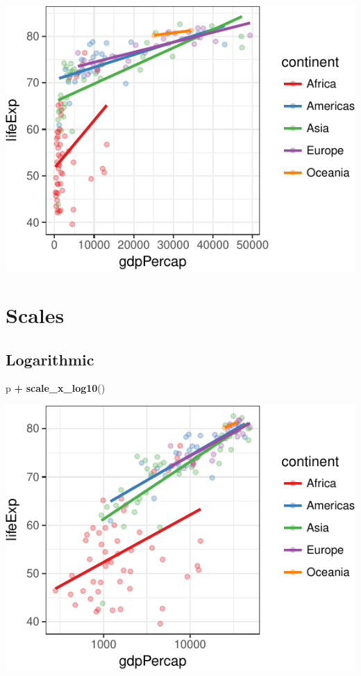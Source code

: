 \documentclass[12pt,]{krantz}
\makeatletter
\newenvironment{Shaded}{\begin{snugshade}}{\end{snugshade}}
\newcommand{\KeywordTok}[1]{\textcolor[rgb]{0.13,0.29,0.53}{\textbf{#1}}}
\newcommand{\NormalTok}[1]{#1}
\newcommand{\OperatorTok}[1]{\textcolor[rgb]{0.81,0.36,0.00}{\textbf{#1}}}
\newcommand{\StringTok}[1]{\textcolor[rgb]{0.31,0.60,0.02}{#1}}
\newenvironment{kframe}{%
\medskip{}
\setlength{\fboxsep}{.8em}
 \def\at@end@of@kframe{}%
 \ifinner\ifhmode%
  \def\at@end@of@kframe{\end{minipage}}%
  \begin{minipage}{\columnwidth}%
 \fi\fi%
 \def\FrameCommand##1{\hskip\@totalleftmargin \hskip-\fboxsep
 \colorbox{shadecolor}{##1}\hskip-\fboxsep
     \hskip-\linewidth \hskip-\@totalleftmargin \hskip\columnwidth}%
 \MakeFramed {\advance\hsize-\width
   \@totalleftmargin\z@ \linewidth\hsize
   \@setminipage}}%
 {\par\unskip\endMakeFramed%
 \at@end@of@kframe}
\renewenvironment{Shaded}{\begin{kframe}}{\end{kframe}}
\theoremstyle{definition}
\theoremstyle{definition}
\theoremstyle{definition}
\theoremstyle{remark}
\makeatother
\begin{document}
\includegraphics{05_fine_tuning_plots_files/figure-latex/unnamed-chunk-1-1.pdf}

\hypertarget{scales}{%
\section{Scales}\label{scales}}

\hypertarget{logarithmic}{%
\subsection{Logarithmic}\label{logarithmic}}

\begin{Shaded}
\begin{Highlighting}[]
\NormalTok{p }\OperatorTok{+}
\StringTok{  }\KeywordTok{scale_x_log10}\NormalTok{()}
\end{Highlighting}
\end{Shaded}

\includegraphics{05_fine_tuning_plots_files/figure-latex/unnamed-chunk-2-1.pdf}
\end{document}
